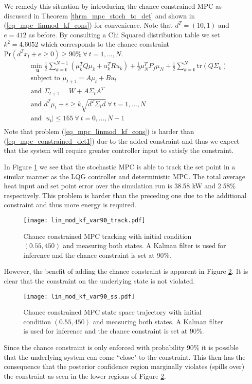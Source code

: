 We remedy this situation by introducing the chance constrained MPC as discussed in Theorem \ref{thrm_mpc_stoch_to_det} and shown in (\ref{eq_mpc_linmod_kf_cons}) for convenience. Note that $d^T = (10, 1)$ and $e=412$ as before. By consulting a Chi Squared distribution table we set $k^2 = 4.6052$ which corresponds to the chance constraint $\text{Pr}(d^Tx_t + e \geq 0) \geq 90\% ~\forall ~t=1,...,N$.
\begin{equation}
\begin{aligned}
&\underset{\mathbf{u}}{\text{min }} \frac{1}{2}\sum_{k=0}^{N-1} \left( \mu_k^TQ\mu_k + u_k^TRu_k \right) + \frac{1}{2}\mu_N^TP_f\mu_N + \frac{1}{2}\sum_{k=0}^N \text{tr}(Q\Sigma_k) \\
& \text{subject to } \mu_{t+1}=A\mu_t + Bu_t \\
& \text{and } \Sigma_{t+1} = W+A\Sigma_t A^T \\
& \text{and } d^T\mu_t + e \geq k\sqrt{d^T \Sigma_t d} ~\forall ~t=1,...,N\\
& \text{and } |u_t| \leq 165 ~\forall ~t=0,...,N-1\\
\end{aligned}
\label{eq_mpc_linmod_kf_cons}
\end{equation}
Note that problem (\ref{eq_mpc_linmod_kf_cons}) is harder than (\ref{eq_mpc_constrained_det1}) due to the added constraint and thus we expect that the system will require greater controller input to satisfy the constraint. 

In Figure \ref{fig_lin_mod_kf_var90_track} we see that the stochastic MPC is able to track the set point in a similar manner as the LQG controller and deterministic MPC. The total average heat input and set point error over the simulation run is  38.58 kW and 2.58\% respectively. This problem is harder than the preceding one due to the additional constraint and thus more energy is required. 
\begin{figure}[H] 
\centering
\texttt{[image: lin\_mod\_kf\_var90\_track.pdf]}
\caption{Chance constrained MPC tracking with initial condition $(0.55, 450)$ and measuring both states. A Kalman filter is used for inference and the chance constraint is set at 90\%.}
\label{fig_lin_mod_kf_var90_track}
\end{figure}
However, the benefit of adding the chance constraint is apparent in Figure \ref{fig_lin_mod_kf_var90_ss}. It is clear that the constraint on the underlying state is not violated.
\begin{figure}[H] 
\centering
\texttt{[image: lin\_mod\_kf\_var90\_ss.pdf]}
\caption{Chance constrained MPC state space trajectory with initial condition $(0.55, 450)$ and measuring both states. A Kalman filter is used for inference and the chance constraint is set at 90\%.}
\label{fig_lin_mod_kf_var90_ss}
\end{figure}
Since the chance constraint is only enforced with probability 90\% it is possible that the underlying system can come ``close" to the constraint. This then has the consequence that the posterior confidence region marginally violates (spills over) the constraint as seen in the lower regions of Figure \ref{fig_lin_mod_kf_var90_ss}.
 

